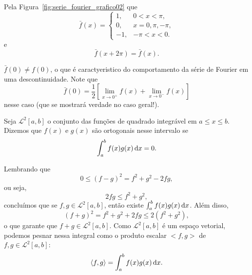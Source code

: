 Pela Figura~\ref{fig:serie_fourier_grafico02} que
\begin{dmath*}
  \bar{f}(x) = \begin{cases}
    1, & 0 < x < \pi, \\
    0, & x = 0, \pi, -\pi, \\
    -1, & -\pi < x < 0.
  \end{cases}
\end{dmath*}
e
\begin{dmath*}
  \bar{f}(x + 2 \pi) = \bar{f}(x).
\end{dmath*}

\begin{obs}
  $\bar{f}(0) \neq f(0)$, o que é caractyeristico do comportamento da série de
  Fourier em uma descontinuidade. Note que
  \begin{dmath*}
    \bar{f}(0) = \frac{1}{2} \left[ \lim_{x \to 0^+} f(x) + \lim_{x \to 0^-}
    f(x) \right]
  \end{dmath*}
  nesse caso (que se mostrará verdade no caso geral!).
\end{obs}

\begin{defi}
  Seja $\mathcal{L}^2[a, b]$ o conjunto das funções de quadrado integrável em $a
  \leq x \leq b$. Dizemos que $f(x)$ e $g(x)$ são ortogonais nesse intervalo se
  \begin{dmath*}
    \int_a^b f(x) g(x) \vi{x} = 0.
  \end{dmath*}
\end{defi}

\begin{obs}
  Lembrando que
  \begin{dmath*}
    0 \leq \left( f - g \right)^2 = f^2 + g^2 - 2 f g,
  \end{dmath*}
  ou seja,
  \begin{dmath*}
    2 f g \leq f^2 + g^2,
  \end{dmath*}
  concluímos que se $f, g \in \mathcal{L}^2[a, b]$, então existe $\int_a^b f(x)
  g(x) \, \mathrm{d}x$. Além disso,
  \begin{dmath*}
    \left( f + g \right)^2 = f^2 + g^2 + 2 f g \leq 2 \left( f^2 + g^2 \right),
  \end{dmath*}
  o que garante que $f + g \in \mathcal{L}^2[a, b]$. Como $\mathcal{L}^2[a, b]$
  é um espaço vetorial, podemos pesnar nessa integral como o produto escalar
  $<f, g>$ de $f, g \in \mathcal{L}^2[a, b]$:
  \begin{dmath*}
    \langle f, g \rangle = \int_a^b f(x) g(x) \vi{x}.
  \end{dmath*}
\end{obs}

